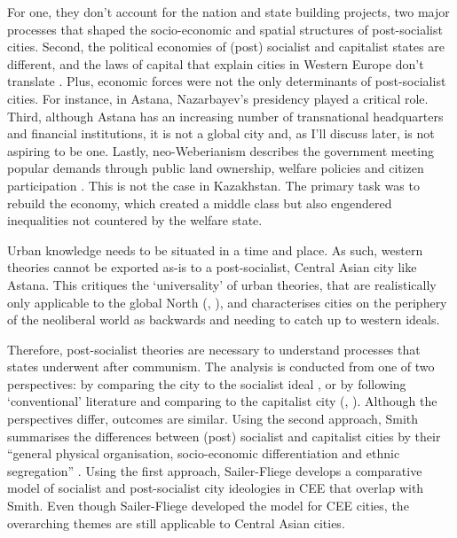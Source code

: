 \documentclass{article}
\begin{document}
For one, they don't account for the nation and state building projects, two major processes that shaped the socio-economic and spatial structures of post-socialist cities.
Second, the political economies of (post) socialist and capitalist states are different, and the laws of capital that explain cities in Western Europe don't translate \parencite{hirt2013whatever}. Plus, economic forces were not the only determinants of post-socialist cities. For instance, in Astana, Nazarbayev's presidency played a critical role.
Third, although Astana has an increasing number of transnational headquarters and financial institutions, it is not a global city and, as I'll discuss later, is not aspiring to be one.
Lastly, neo-Weberianism describes the government meeting popular demands through public land ownership, welfare policies and citizen participation \parencite{haussermann2005european}. This is not the case in Kazakhstan. The primary task was to rebuild the economy, which created a middle class but also engendered inequalities not countered by the welfare state.

Urban knowledge needs to be situated in a time and place. As such, western theories cannot be exported as-is to a post-socialist, Central Asian city like Astana. This critiques the `universality' of urban theories, that are realistically only applicable to the global North (\cite{ferenvcuhova2016accounts}, \cite{robinson2013ordinary}), and characterises cities on the periphery of the neoliberal world as backwards and needing to catch up to western ideals.

Therefore, post-socialist theories are necessary to understand processes that states underwent after communism. The analysis is conducted from one of two perspectives: by comparing the city to the socialist ideal \parencite{sailer1999characteristics}, or by following `conventional' literature and comparing to the capitalist city (\cite{smith1996socialist}, \cite{haussermann1996socialist}). Although the perspectives differ, outcomes are similar. Using the second approach, Smith summarises the differences between (post) socialist and capitalist cities by their ``general physical organisation, socio-economic differentiation and ethnic segregation'' \parencite{smith1996socialist}. Using the first approach, Sailer-Fliege develops a comparative model of socialist and post-socialist city ideologies in CEE that overlap with Smith. Even though Sailer-Fliege developed the model for CEE cities, the overarching themes are still applicable to Central Asian cities.
\end{document}
